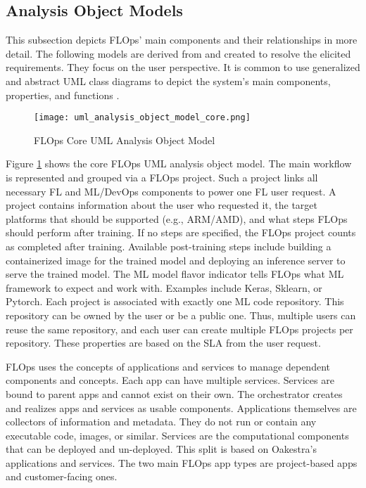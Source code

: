 \subsection{Analysis Object Models}

This subsection depicts FLOps' main components and their relationships in more detail.
The following models are derived from and created to resolve the elicited requirements.
They focus on the user perspective.
It is common to use generalized and abstract UML class diagrams to depict the system's main components, properties, and functions \cite{book:bruegge}.

\begin{figure}[h]
    \centering
    \texttt{[image: uml\_analysis\_object\_model\_core.png]}
    \caption{FLOps Core UML Analysis Object Model}
    \label{fig:uml_core_analysis_object_model}
\end{figure}

Figure \ref{fig:uml_core_analysis_object_model} shows the core FLOps UML analysis object model.
The main workflow is represented and grouped via a FLOps project.
Such a project links all necessary FL and ML/DevOps components to power one FL user request.
A project contains information about the user who requested it, the target platforms that should be supported (e.g., ARM/AMD), and what steps FLOps should perform after training.
If no steps are specified, the FLOps project counts as completed after training.
Available post-training steps include building a containerized image for the trained model and deploying an inference server to serve the trained model.
The ML model flavor indicator tells FLOps what ML framework to expect and work with.
Examples include Keras, Sklearn, or Pytorch.
Each project is associated with exactly one ML code repository.
This repository can be owned by the user or be a public one.
Thus, multiple users can reuse the same repository, and each user can create multiple FLOps projects per repository.
These properties are based on the SLA from the user request.

FLOps uses the concepts of applications and services to manage dependent components and concepts.
Each app can have multiple services.
Services are bound to parent apps and cannot exist on their own.
The orchestrator creates and realizes apps and services as usable components.
Applications themselves are collectors of information and metadata.
They do not run or contain any executable code, images, or similar.
Services are the computational components that can be deployed and un-deployed.
This split is based on Oakestra's applications and services.
The two main FLOps app types are project-based apps and customer-facing ones.

